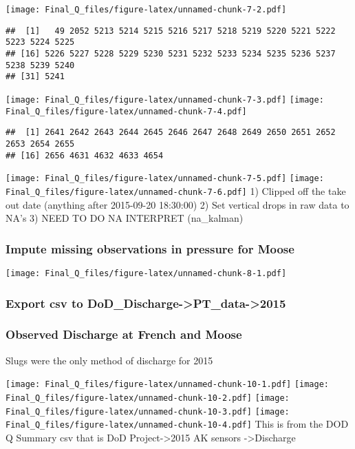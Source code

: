 \documentclass[
]{article}
\begin{document}
\texttt{[image: Final\_Q\_files/figure-latex/unnamed-chunk-7-2.pdf]}

\begin{verbatim}
##  [1]   49 2052 5213 5214 5215 5216 5217 5218 5219 5220 5221 5222 5223 5224 5225
## [16] 5226 5227 5228 5229 5230 5231 5232 5233 5234 5235 5236 5237 5238 5239 5240
## [31] 5241
\end{verbatim}

\texttt{[image: Final\_Q\_files/figure-latex/unnamed-chunk-7-3.pdf]}
\texttt{[image: Final\_Q\_files/figure-latex/unnamed-chunk-7-4.pdf]}

\begin{verbatim}
##  [1] 2641 2642 2643 2644 2645 2646 2647 2648 2649 2650 2651 2652 2653 2654 2655
## [16] 2656 4631 4632 4633 4654
\end{verbatim}

\texttt{[image: Final\_Q\_files/figure-latex/unnamed-chunk-7-5.pdf]}
\texttt{[image: Final\_Q\_files/figure-latex/unnamed-chunk-7-6.pdf]} 1)
Clipped off the take out date (anything after 2015-09-20 18:30:00) 2)
Set vertical drops in raw data to NA's 3) NEED TO DO NA INTERPRET
(na\_kalman)

\hypertarget{impute-missing-observations-in-pressure-for-moose-1}{%
\subsubsection{Impute missing observations in pressure for
Moose}\label{impute-missing-observations-in-pressure-for-moose-1}}

\texttt{[image: Final\_Q\_files/figure-latex/unnamed-chunk-8-1.pdf]}

\hypertarget{export-csv-to-dod_discharge-pt_data-2015-1}{%
\subsubsection{Export csv to
DoD\_Discharge-\textgreater PT\_data-\textgreater2015}\label{export-csv-to-dod_discharge-pt_data-2015-1}}

\hypertarget{observed-discharge-at-french-and-moose}{%
\subsubsection{Observed Discharge at French and
Moose}\label{observed-discharge-at-french-and-moose}}

Slugs were the only method of discharge for 2015

\texttt{[image: Final\_Q\_files/figure-latex/unnamed-chunk-10-1.pdf]}
\texttt{[image: Final\_Q\_files/figure-latex/unnamed-chunk-10-2.pdf]}
\texttt{[image: Final\_Q\_files/figure-latex/unnamed-chunk-10-3.pdf]}
\texttt{[image: Final\_Q\_files/figure-latex/unnamed-chunk-10-4.pdf]} This
is from the DOD Q Summary csv that is DoD Project-\textgreater2015 AK
sensors -\textgreater Discharge
\end{document}
